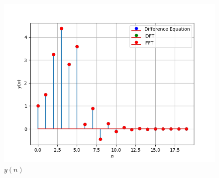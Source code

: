 \documentclass[journal,12pt,twocolumn]{IEEEtran}
\renewcommand\thesection{\arabic{section}}
\begin{document}
\begin{enumerate}[label=\thesection.\arabic*]
\begin{figure}[!ht]
	\centering
	\includegraphics[width=\columnwidth]{./figs/6.4.png}
	\caption{ $y(n)$ }
	\label{fig:6.5}
\end{figure}

\end{enumerate}
\end{document}

